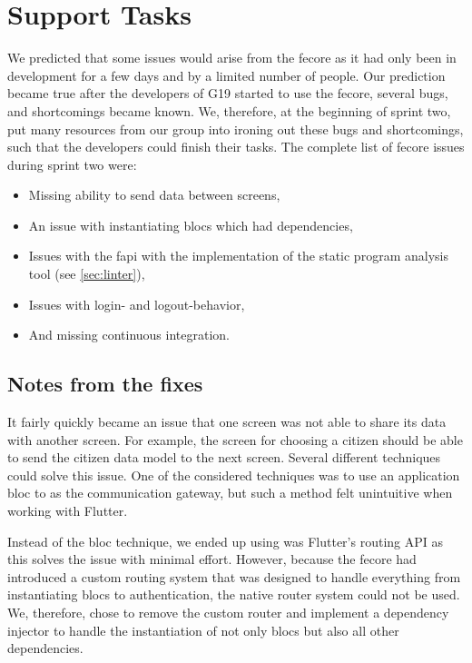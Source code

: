 \section{Support Tasks}
We predicted that some issues would arise from the \gls{fecore} as it had only been in development for a few days and by a limited number of people. Our prediction became true after the developers of \gls{G19} started to use the \gls{fecore}, several bugs, and shortcomings became known. We, therefore, at the beginning of sprint two, put many resources from our group into ironing out these bugs and shortcomings, such that the developers could finish their tasks. The complete list of \gls{fecore} issues during sprint two were:

\begin{itemize}
  \item Missing ability to send data between screens,
  \item An issue with instantiating \glspl{bloc} which had dependencies,
  \item Issues with the \gls{fapi} with the implementation of the static program analysis tool (see \autoref{sec:linter}),
  \item Issues with login- and logout-behavior,
  \item And missing continuous integration.
\end{itemize}

\subsection{Notes from the fixes}

It fairly quickly became an issue that one screen was not able to share its data with another screen. For example, the screen for choosing a citizen should be able to send the citizen data model to the next screen. Several different techniques could solve this issue. One of the considered techniques was to use an application \gls{bloc} to as the communication gateway, but such a method felt unintuitive when working with Flutter.

Instead of the \gls{bloc} technique, we ended up using was Flutter's routing API as this solves the issue with minimal effort. However, because the \gls{fecore} had introduced a custom routing system that was designed to handle everything from instantiating \glspl{bloc} to authentication, the native router system could not be used. We, therefore, chose to remove the custom router and implement a dependency injector to handle the instantiation of not only \glspl{bloc} but also all other dependencies.

